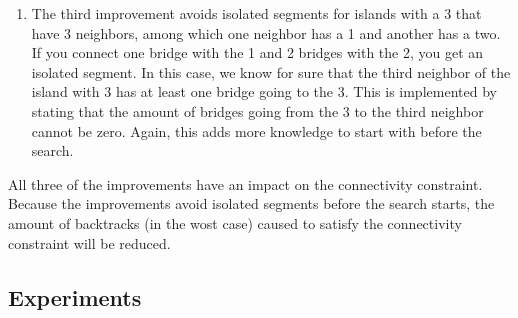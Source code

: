 \documentclass{report}
\begin{document}
\begin{enumerate}
	\item The third improvement avoids isolated segments for islands with a 3 that have 3 neighbors, among which one neighbor has a 1 and another has a two. If you connect one bridge with the 1 and 2 bridges with the 2, you get an isolated segment. In this case, we know for sure that the third neighbor of the island with 3 has at least one bridge going to the 3. This is implemented by stating that the amount of bridges going from the 3 to the third neighbor cannot be zero. Again, this adds more knowledge to start with before the search.
\end{enumerate}

All three of the improvements have an impact on the connectivity constraint. Because the improvements avoid isolated segments before the search starts, the amount of backtracks (in the wost case) caused to satisfy the connectivity constraint will be reduced.

\subsection{Experiments}
\end{document}
